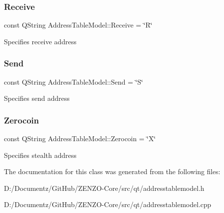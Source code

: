 \subsubsection{\texorpdfstring{Receive}{Receive}}
{\footnotesize\ttfamily const Q\+String Address\+Table\+Model\+::\+Receive = \char`\"{}R\char`\"{}\hspace{0.3cm}{\ttfamily [static]}}

Specifies receive address \mbox{\label{class_address_table_model_a7c74e158d014a757c2edcc5bcb1e9a62}} 
\subsubsection{\texorpdfstring{Send}{Send}}
{\footnotesize\ttfamily const Q\+String Address\+Table\+Model\+::\+Send = \char`\"{}S\char`\"{}\hspace{0.3cm}{\ttfamily [static]}}

Specifies send address \mbox{\label{class_address_table_model_a8792d7ee2440aa349488ed6a369e50b6}} 
\subsubsection{\texorpdfstring{Zerocoin}{Zerocoin}}
{\footnotesize\ttfamily const Q\+String Address\+Table\+Model\+::\+Zerocoin = \char`\"{}X\char`\"{}\hspace{0.3cm}{\ttfamily [static]}}

Specifies stealth address 

The documentation for this class was generated from the following files\+:\begin{DoxyCompactItemize}
\item 
D\+:/\+Documentz/\+Git\+Hub/\+Z\+E\+N\+Z\+O-\/\+Core/src/qt/addresstablemodel.\+h\item 
D\+:/\+Documentz/\+Git\+Hub/\+Z\+E\+N\+Z\+O-\/\+Core/src/qt/addresstablemodel.\+cpp\end{DoxyCompactItemize}
